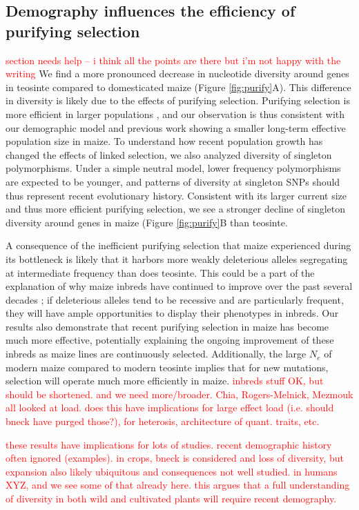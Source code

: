 \documentclass{pnastwo}
\newcommand{\jri}[1]{\textcolor{red}{\scriptsize #1}}
\begin{document}
\begin{article}
\subsection{Demography influences the efficiency of purifying selection}
\jri{section needs help -- i think all the points are there but i'm not happy with the writing} 
We find a more pronounced decrease in nucleotide diversity around genes in teosinte compared to domesticated maize (Figure \ref{fig:purify}A).
This difference in diversity is likely due to the effects of purifying selection.
Purifying selection is more efficient in larger populations  \cite{kimura1984}, and our observation is thus consistent with our demographic model and previous work \cite{eyre1998, tenaillon2004selection, wright2005, ross2009} showing a smaller long-term effective population size in maize.  
To understand how recent population growth has changed the effects of linked selection, we also analyzed diversity of singleton polymorphisms.   Under a simple neutral model, lower frequency polymorphisms are expected to be younger, and patterns of diversity at singleton SNPs should thus represent recent evolutionary history. 
Consistent with its larger current size and thus more efficient purifying selection, we see a stronger decline of singleton diversity around genes in maize (Figure \ref{fig:purify}B than teosinte.

A consequence of the inefficient purifying selection that maize experienced during its bottleneck is likely that it harbors more weakly deleterious alleles segregating at intermediate frequency than does teosinte. This could be a part of the explanation of why maize inbreds have continued to improve over the past several decades \cite{meghji1984}; if deleterious alleles tend to be recessive and are particularly frequent, they will have ample opportunities to display their phenotypes in inbreds. Our results also demonstrate that recent purifying selection in maize has become much more effective, potentially explaining the ongoing improvement of these inbreds as maize lines are continuously selected. Additionally, the large $N_e$ of modern maize compared to modern teosinte implies that for new mutations, selection will operate much more efficiently in maize. \jri{inbreds stuff OK, but should be shortened.  and we need more/broader. Chia, Rogers-Melnick, Mezmouk all looked at load. does this have implications for large effect load (i.e. should bneck have purged those?), for heterosis, architecture of quant. traits, etc.}

\jri{these results have implications for lots of studies. recent demographic history often ignored (examples). in crops, bneck is considered and loss of diversity, but expansion also likely ubiquitous and consequences not well studied.  in humans XYZ, and we see some of that already here. this argues that a full understanding of diversity in both wild and cultivated plants will require recent demography.}


\end{article}
\end{document}
